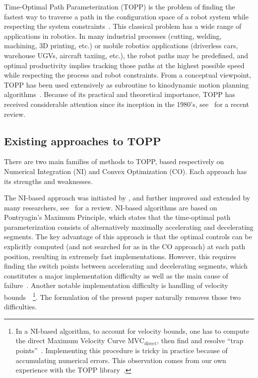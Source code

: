 \documentclass[journal]{IEEEtran}
\theoremstyle{plain}
\theoremstyle{definition}
\theoremstyle{definition}
\begin{document}
Time-Optimal Path Parameterization (TOPP) is the problem of finding
the fastest way to traverse a path in the configuration space of a
robot system while respecting the system
constraints~\cite{bobrow1985time}. This classical problem has a wide
range of applications in robotics. In many industrial processes
(cutting, welding, machining, 3D printing, etc.) or mobile robotics
applications (driverless cars, warehouse UGVs, aircraft taxiing, etc.),
the robot paths may be predefined, and optimal productivity implies
tracking those paths at the highest possible speed while respecting
the process and robot constraints. From a conceptual viewpoint, TOPP
has been used extensively as subroutine to kinodynamic motion planning
algorithms~\cite{SD91tra, pham2017admissible}. Because of its
practical and theoretical importance, TOPP has received considerable
attention since its inception in the 1980's,
see~\cite{pham2014general} for a recent review.

\subsection*{Existing approaches to TOPP}

There are two main families of methods to TOPP, based respectively on
Numerical Integration (NI) and Convex Optimization (CO). Each approach
has its strengths and weaknesses.

The NI-based approach was initiated by \cite{bobrow1985time}, and
further improved and extended by many researchers,
see~\cite{pham2014general} for a review. NI-based algorithms are based
on Pontryagin's Maximum Principle, which states that the time-optimal
path parameterization consists of alternatively maximally accelerating
and decelerating segments. The key advantage of this approach is that
the optimal controls can be explicitly computed (and not searched for
as in the CO approach) at each path position, resulting in extremely
fast implementations. However, this requires finding the switch points
between accelerating and decelerating segments, which constitutes a
major implementation difficulty as well as the main cause of
failure~\cite{pfeiffer1987concept,slotine1989improving,shiller1992computation,pham2014general}. Another
notable implementation difficulty is handling of velocity
bounds~\cite{Zla96icra}~\footnote{In a NI-based algorithm, to account
  for velocity bounds, one has to compute the direct Maximum Velocity
  Curve \(\mathrm{MVC}_{\mathrm{direct}}\), then find and resolve
  ``trap points''~\cite{Zla96icra}.  Implementing this procedure is
  tricky in practice because of accumulating numerical errors. This
  observation comes from our own experience with the TOPP
  library~\cite{pham2014general}.}. The formulation of the present
paper naturally removes those two difficulties.
\end{document}
